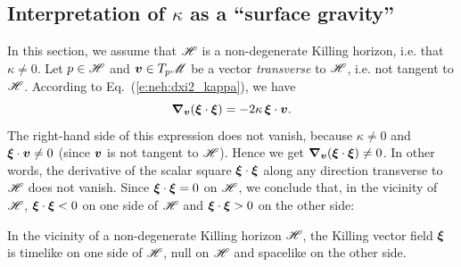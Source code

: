 \subsection{Interpretation of $\kappa$ as a ``surface gravity''}
\label{s:neh:surface_gravity}

In this section, we assume that $\mathscr{H}$ is a non-degenerate Killing horizon,
i.e. that $\kappa\not=0$.
Let $p\in\mathscr{H}$ and $\bm{v}\in T_p\mathscr{M}$ be a vector \emph{transverse} to $\mathscr{H}$, i.e.
not tangent to $\mathscr{H}$. According to Eq.~(\ref{e:neh:dxi2_kappa}), we have
\[
    \bm{\nabla}_{\bm{v}} (\bm{\xi}\cdot\bm{\xi}) = - 2\kappa \, \bm{\xi}\cdot\bm{v} .
\]
The right-hand side of this expression does not vanish, because
$\kappa\not=0$ and $\bm{\xi}\cdot\bm{v} \not=0$ (since $\bm{v}$ is not
tangent to $\mathscr{H}$). Hence we get
$\bm{\nabla}_{\bm{v}} (\bm{\xi}\cdot\bm{\xi}) \not= 0$.
In other words, the derivative of the scalar square $\bm{\xi}\cdot\bm{\xi}$
along any direction transverse to $\mathscr{H}$ does not vanish. Since
$\bm{\xi}\cdot\bm{\xi}=0$ on $\mathscr{H}$, we conclude that, in the vicinity of $\mathscr{H}$,
$\bm{\xi}\cdot\bm{\xi}<0$ on one side of $\mathscr{H}$ and $\bm{\xi}\cdot\bm{\xi}>0$ on the
other side:
\begin{prop}
In the vicinity of a non-degenerate Killing horizon $\mathscr{H}$, the Killing vector field $\bm{\xi}$ is timelike on one side of $\mathscr{H}$, null on $\mathscr{H}$
and spacelike on the other side.
\end{prop}

